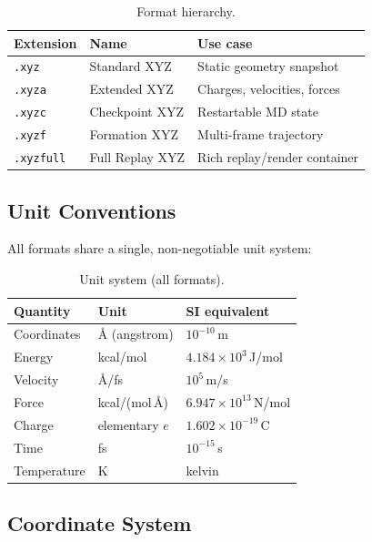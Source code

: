 \documentclass[12pt, a4paper, oneside]{article}
\begin{document}
\begin{table}[htbp]
  \centering
  \caption{Format hierarchy.}
  \label{tab:hierarchy}
  \begin{tabular}{llp{8cm}}
    \toprule
    Extension & Name & Use case \\
    \midrule
    \texttt{.xyz}     & Standard XYZ     & Static geometry snapshot \\
    \texttt{.xyza}    & Extended XYZ     & Charges, velocities, forces \\
    \texttt{.xyzc}    & Checkpoint XYZ   & Restartable MD state \\
    \texttt{.xyzf}    & Formation XYZ    & Multi-frame trajectory \\
    \texttt{.xyzfull} & Full Replay XYZ  & Rich replay/render container \\
    \bottomrule
  \end{tabular}
\end{table}

\subsection{Unit Conventions}

All formats share a single, non-negotiable unit system:

\begin{table}[htbp]
  \centering
  \caption{Unit system (all formats).}
  \label{tab:units}
  \begin{tabular}{lll}
    \toprule
    Quantity & Unit & SI equivalent \\
    \midrule
    Coordinates   & \AA{} (angstrom) & $10^{-10}$\,m \\
    Energy        & kcal/mol         & $4.184 \times 10^{3}$\,J/mol \\
    Velocity      & \AA/fs           & $10^{5}$\,m/s \\
    Force         & kcal/(mol\,\AA)  & $6.947 \times 10^{13}$\,N/mol \\
    Charge        & elementary $e$   & $1.602 \times 10^{-19}$\,C \\
    Time          & fs               & $10^{-15}$\,s \\
    Temperature   & K                & kelvin \\
    \bottomrule
  \end{tabular}
\end{table}

\subsection{Coordinate System}
\end{document}

